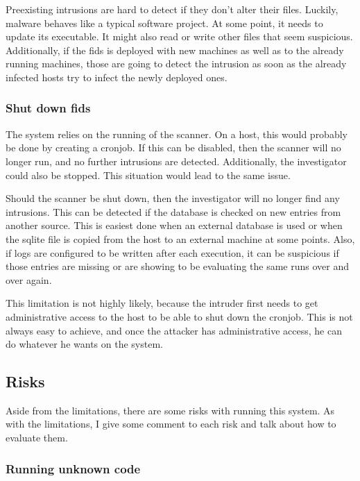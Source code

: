 Preexisting \glspl{intrusion} are hard to detect if they don't alter their files. Luckily, malware behaves like a typical software project. At some point, it needs to update its executable. It might also read or write other files that seem suspicious. Additionally, if the \gls{fids} is deployed with new machines as well as to the already running machines, those are going to detect the \gls{intrusion} as soon as the already infected hosts try to infect the newly deployed ones.

\subsubsection{Shut down \gls{fids}}
\label{sec:limitation:noscan}
The system relies on the running of the scanner. On a host, this would probably be done by creating a cronjob. If this can be disabled, then the scanner will no longer run, and no further \glspl{intrusion} are detected. Additionally, the investigator could also be stopped. This situation would lead to the same issue.

Should the scanner be shut down, then the investigator will no longer find any \glspl{intrusion}. This can be detected if the database is checked on new entries from another source. This is easiest done when an external database is used or when the \gls{sqlite} file is copied from the host to an external machine at some points. Also, if logs are configured to be written after each execution, it can be suspicious if those entries are missing or are showing to be evaluating the same runs over and over again. 

This limitation is not highly likely, because the intruder first needs to get administrative access to the host to be able to shut down the cronjob. This is not always easy to achieve, and once the attacker has administrative access, he can do whatever he wants on the system. 

\subsection{Risks}
\label{sec:risk}

Aside from the limitations, there are some risks with running this system. As with the limitations, I give some comment to each risk and talk about how to evaluate them.

\subsubsection{Running unknown code}
\label{sec:risk:unknowncode}

